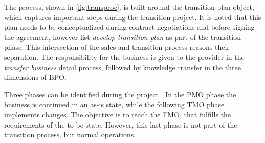 	The process, shown in \Fig \ref{fig:transproc}, is built around the transition plan object, which captures important steps during the transition project. It is noted that this plan needs to be conceptualized during contract negotiations and before signing the agreement, however \cite{deloittehandbook} list \textit{develop transition plan} as part of the transition phase. This intersection of the sales and transition process reasons their separation. The responsibility for the business is given to the provider in the \textit{transfer business} detail process, followed by knowledge transfer in the three dimensions of \acrshort{BPO}. 
	
	Three phases can be identified during the project \citep{bitkom2008, 0273705601}. In the \acrfull{PMO} phase the business is continued in an as-is state, while the following  \acrfull{TMO} phase implements changes. The objective is to reach the \acrfull{FMO}, that fulfills the requirements of the to-be state. However, this last phase is not part of the transition process, but normal operations. 
	
